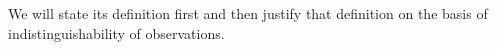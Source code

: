 %
We will state its definition first and then justify that definition on the basis of indistinguishability of observations.
%
